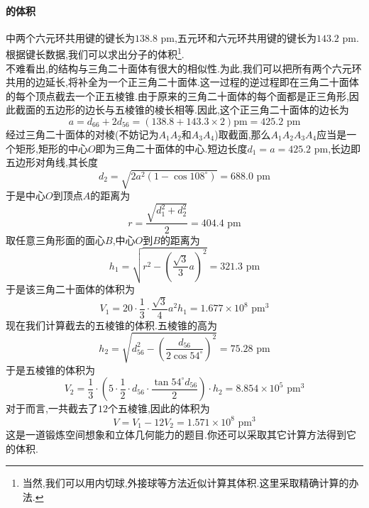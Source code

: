 \documentclass{ctexart}
\begin{document}
\paragraph{的体积}
中两个六元环共用键的键长为$138.8\text{ pm}$,五元环和六元环共用键的键长为$143.2\text{ pm}$.根据键长数据,我们可以求出分子的体积\footnote{当然,我们可以用内切球,外接球等方法近似计算其体积.这里采取精确计算的办法.}.\\
\indent 不难看出,的结构与三角二十面体有很大的相似性.为此,我们可以把所有两个六元环共用的边延长,将补全为一个正三角二十面体.这一过程的逆过程即在三角二十面体的每个顶点截去一个正五棱锥.由于原来的三角二十面体的每个面都是正三角形,因此截面的五边形的边长与五棱锥的棱长相等.因此,这个正三角二十面体的边长为
\[a=d_{66}+2d_{56}=(138.8+143.3\times2)\text{pm}=425.2\text{ pm}\]
经过三角二十面体的对棱(不妨记为$A_1A_2$和$A_3A_4$)取截面,那么$A_1A_2A_3A_4$应当是一个矩形,矩形的中心$O$即为三角二十面体的中心.短边长度$d_1=a=425.2\text{ pm}$,长边即五边形对角线,其长度
\[d_2=\sqrt{2a^2\left(1-\cos108^\circ\right)}=688.0\text{ pm}\]
于是中心$O$到顶点$A$的距离为
\[r=\dfrac{\sqrt{d_1^2+d_2^2}}{2}=404.4\text{ pm}\]
取任意三角形面的面心$B$,中心$O$到$B$的距离为
\[h_1=\sqrt{r^2-\left(\dfrac{\sqrt3}{3}a\right)^2}=321.3\text{ pm}\]
于是该三角二十面体的体积为
\[V_1=20\cdot\dfrac13\cdot\dfrac{\sqrt3}{4}a^2h_1=1.677\times10^{8}\text{ pm}^3\]
\indent 现在我们计算截去的五棱锥的体积.五棱锥的高为
\[h_2=\sqrt{d_{56}^2-\left(\dfrac{d_{56}}{2\cos54^\circ}\right)^2}=75.28\text{ pm}\]
于是五棱锥的体积为
\[V_2=\dfrac13\cdot\left(5\cdot\dfrac12\cdot d_{56}\cdot\dfrac{\tan54^\circ d_{56}}{2}\right)\cdot h_2=8.854\times10^5\text{ pm}^3\]
\indent 对于而言,一共截去了$12$个五棱锥,因此的体积为
\[V=V_1-12V_2=1.571\times10^{8}\text{ pm}^3\]
\indent 这是一道锻炼空间想象和立体几何能力的题目.你还可以采取其它计算方法得到它的体积.
\end{document}
